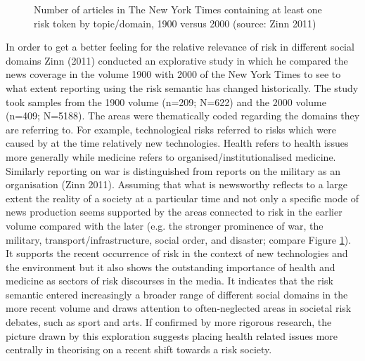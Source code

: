 \begin{figure}[htb!]
\centering
{}
\caption[Number of articles containing at least one risk token by topic]{Number of articles in The New York Times containing at least one risk token by topic\slash domain, 1900 versus 2000 (source: Zinn 2011)}
\label{fig:rdomains}
\end{figure}

In order to get a better feeling for the relative relevance of risk in different social domains Zinn (2011) conducted an explorative study in which he compared the news coverage in the volume 1900 with 2000 of the New York Times to see to what extent reporting using the risk semantic has changed historically. The study took samples from the 1900 volume (n=209; N=622) and the 2000 volume (n=409; N=5188). The areas were thematically coded regarding the domains they are referring to. For example, technological risks referred to risks which were caused by at the time relatively new technologies. Health refers to health issues more generally while medicine refers to organised\slash institutionalised medicine. Similarly reporting on war is distinguished from reports on the military as an organisation (Zinn 2011). Assuming that what is newsworthy reflects to a large extent the reality of a society at a particular time and not only a specific mode of news production seems supported by the areas connected to risk in the earlier volume compared with the later (e.g. the stronger prominence of war, the military, transport\slash infrastructure, social order, and disaster; compare Figure \ref{fig:rdomains}). It supports the recent occurrence of risk in the context of new technologies and the environment but it also shows the outstanding importance of health and medicine as sectors of risk discourses in the media. It indicates that the risk semantic entered increasingly a broader range of different social domains in the more recent volume and draws attention to often-neglected areas in societal risk debates, such as sport and arts. If confirmed by more rigorous research, the picture drawn by this exploration suggests placing health related issues more centrally in theorising on a recent shift towards a risk society. 


